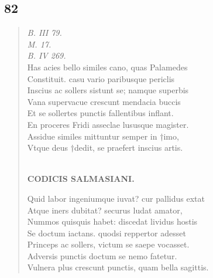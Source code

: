 \documentclass[11pt, a4paper]{report}
\begin{document}
            \subsection*{82}
      \begin{verse}
      \textit{B. III 79.} \\ \textit{M. 17.} \\ \textit{B. IV 269.} \\ Has acies bello similes cano, quas Palamedes \\ Constituit. casu vario paribusque periclis \\ Inscius ac sollers sistunt se; namque superbis \\ Vana supervacue crescunt mendacia buccis \\ Et se sollertes punctis fallentibus inflant. \\ En proceres Fridi asseclae lususque magister. \\ Assidue similes mittuntur semper in †imo, \\ Vtque deus †dedit, se praefert inscius artis. \\ 
        ﻿\pagebreak 
    \begin{center} \textbf{CODICIS SALMASIANI.} \end{center}Quid labor ingeniumque iuvat? cur pallidus extat \\ Atque iners dubitat? securus ludat amator, \\ Nummos quisquis habet: discedat lividus hostis \\ Se doctum iactans. quodsi reppertor adesset \\ Princeps ac sollers, victum se saepe vocasset. \\ Adversis punctis doctum se nemo fatetur. \\ Vulnera plus crescunt punctis, quam bella sagittis. \\ 
      \end{verse}
  
\end{document}

